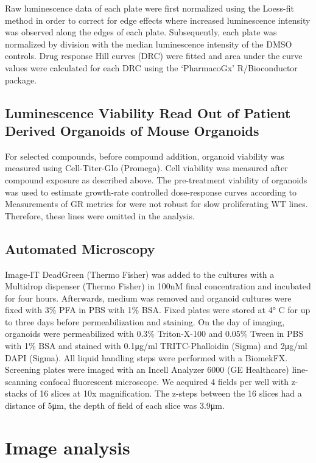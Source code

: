 \begin{flushleft}
Raw luminescence data of each plate were first normalized using the Loess-fit method in order to correct for edge effects where increased luminescence intensity was observed along the edges of each plate. Subsequently, each plate was normalized by division with the median luminescence intensity of the DMSO controls. Drug response Hill curves (DRC) were fitted and area under the curve values were calculated for each DRC using the ‘PharmacoGx’ \parencite{smirnovPharmacoGxPackageAnalysis2016} R/Bioconductor package.

\subsection{Luminescence Viability Read Out of Patient Derived Organoids of Mouse Organoids}
For selected compounds, before compound addition, organoid viability was measured using Cell-Titer-Glo (Promega). Cell viability was measured after compound exposure as described above. The pre-treatment viability of organoids was used to estimate growth-rate controlled dose-response curves according to \parencite{hafnerGrowthRateInhibition2016} Measurements of GR metrics for were not robust for slow proliferating WT lines. Therefore, these lines were omitted in the analysis.

\subsection{Automated Microscopy}
Image-IT DeadGreen (Thermo Fisher) was added to the cultures with a Multidrop dispenser (Thermo Fisher) in 100nM final concentration and incubated for four hours. Afterwards, medium was removed and organoid cultures were fixed with 3\% PFA in PBS with 1\% BSA. Fixed plates were stored at 4° C for up to three days before permeabilization and staining. On the day of imaging, organoids were permeabilized with 0.3\% Triton-X-100 and 0.05\% Tween in PBS with 1\% BSA and stained with 0.1μg/ml TRITC-Phalloidin (Sigma) and 2μg/ml DAPI (Sigma). All liquid handling steps were performed with a BiomekFX. Screening plates were imaged with an Incell Analyzer 6000 (GE Healthcare) line-scanning confocal fluorescent microscope. We acquired 4 fields per well with z-stacks of 16 slices at 10x magnification. The z-steps between the 16 slices had a distance of 5μm, the depth of field of each slice was 3.9μm.

\section{Image analysis}


\end{flushleft}
